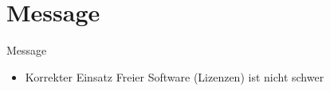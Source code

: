 
\section{Message}

\begin{frame}{Message}
	\begin{itemize}
		\item Korrekter Einsatz Freier Software (Lizenzen) ist nicht schwer
	\end{itemize}
\end{frame}
